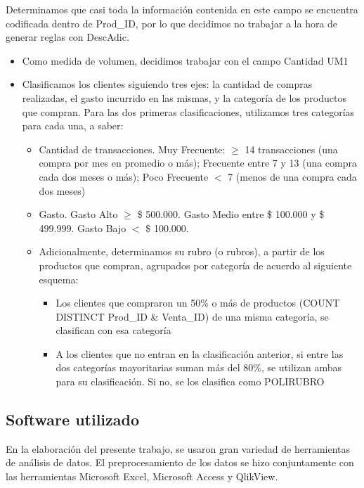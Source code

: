 \documentclass[]{article}
\begin{document}
	
	
	Determinamos que casi toda la información contenida en este campo se encuentra codificada dentro de Prod\_ID, por lo que decidimos no trabajar a la hora de generar reglas con DescAdic.\\
	
	\begin{itemize}
		\item Como medida de volumen, decidimos trabajar con el campo Cantidad UM1
		\item Clasificamos los clientes siguiendo tres ejes: la cantidad de compras realizadas, el gasto incurrido en las mismas, y la categoría de los productos que compran. Para las dos primeras clasificaciones, utilizamos tres categorías para cada una, a saber:
		
		\begin{itemize}
			\item Cantidad de transacciones. Muy Frecuente: $\geq$ 14 transacciones (una compra por mes en promedio o más); Frecuente entre 7 y 13 (una compra cada dos meses o más); Poco Frecuente $<$ 7 (menos de una compra cada dos meses)
			\item Gasto. Gasto Alto $\geq$ \$ 500.000. Gasto Medio entre \$ 100.000 y \$ 499.999. Gasto Bajo $<$ \$ 100.000.
			\item Adicionalmente, determinamos su rubro (o rubros), a partir de los productos que compran, agrupados por categoría de acuerdo al siguiente esquema:
			\begin{itemize}
				\item Los clientes que compraron un 50\% o más de productos (COUNT DISTINCT Prod\_ID \& Venta\_ID) de una misma categoría, se clasifican con esa categoría
				
				\item A los clientes que no entran en la clasificación anterior, si entre las dos categorías mayoritarias suman más del 80\%, se utilizan ambas para su clasificación. Si no, se los clasifica como POLIRUBRO
			\end{itemize}
		\end{itemize}
		
	\end{itemize}
	
	
	
	\subsection{Software utilizado}
	En la elaboración del presente trabajo, se usaron gran variedad de herramientas de análisis de datos. El preprocesamiento de los datos se hizo conjuntamente con las herramientas Microsoft Excel, Microsoft Access y QlikView.\\
	
\end{document}
